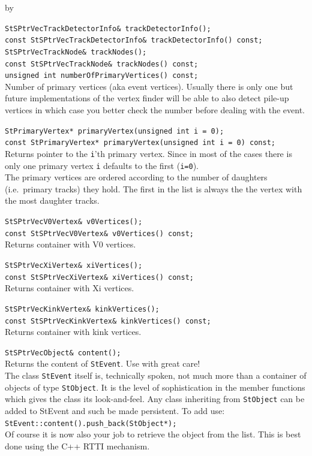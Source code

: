 \documentclass[twoside]{article}
\newcommand{\entrylabel}[1]{\mbox{\textbf{{#1}}}\hfil}%
\newenvironment{entry}
{\begin{list}{}%
    {\renewcommand{\makelabel}{\entrylabel}%
     \setlength{\labelwidth}{90pt}%
     \setlength{\leftmargin}{\labelwidth}
     \advance\leftmargin by \labelsep%
      }%
    }%
  {\end{list}}
\newcommand{\Entrylabel}[1]%
{\raisebox{0pt}[1ex][0pt]{\makebox[\labelwidth][l]%
    {\parbox[t]{\labelwidth}{\hspace{0pt}\textbf{{#1}}}}}}
\newenvironment{Entry}%
{\renewcommand{\entrylabel}{\Entrylabel}\begin{entry}}%
  {\end{entry}}
\begin{document}
\begin{Entry}
    \verb+StSPtrVecTrackDetectorInfo& trackDetectorInfo();+\\
    \verb+const StSPtrVecTrackDetectorInfo& trackDetectorInfo() const;+\\
    
    \verb+StSPtrVecTrackNode& trackNodes();+\\
    \verb+const StSPtrVecTrackNode& trackNodes() const;+\\
    
    \verb+unsigned int numberOfPrimaryVertices() const;+\\
    Number of primary vertices (aka event vertices).  Usually there is
    only one but future implementations of the vertex finder will be
    able to also detect pile-up vertices in which case you better
    check the number before dealing with the event.
    
    \verb+StPrimaryVertex* primaryVertex(unsigned int i = 0);+\\
    \verb+const StPrimaryVertex* primaryVertex(unsigned int i = 0) const;+\\
    Returns pointer to the \texttt{i}'th primary vertex.  Since in
    most of the cases there is only one primary vertex \texttt{i}
    defaults to the first (\texttt{i=0}).\\
    The primary vertices are ordered according to the number of daughters
    (i.e.~primary tracks) they hold. The first in the list is always the
    the vertex with the most daughter tracks.
    
    \verb+StSPtrVecV0Vertex& v0Vertices();+\\
    \verb+const StSPtrVecV0Vertex& v0Vertices() const;+\\
    Returns container with V0 vertices.
    
    \verb+StSPtrVecXiVertex& xiVertices();+\\
    \verb+const StSPtrVecXiVertex& xiVertices() const;+\\
    Returns container with Xi vertices.
    
    \verb+StSPtrVecKinkVertex& kinkVertices();+\\
    \verb+const StSPtrVecKinkVertex& kinkVertices() const;+\\
    Returns container with kink vertices.

    \verb+StSPtrVecObject& content();+\\
    Returns the content of \texttt{StEvent}. Use with great care!\\
    The class \texttt{StEvent} itself is, technically spoken, not
    much more than a container of objects of type \texttt{StObject}.
    It is the level of sophistication in the member functions
    which gives the class its look-and-feel. Any class inheriting
    from \texttt{StObject} can be added to StEvent and such be made
    persistent. To add use:\\
    \texttt{StEvent::content().push\_back(StObject*);}\\
    Of course it is now also your job to retrieve the object from the
    list. This is best done using the C++ RTTI mechanism.
    

\end{Entry}
\end{document}
